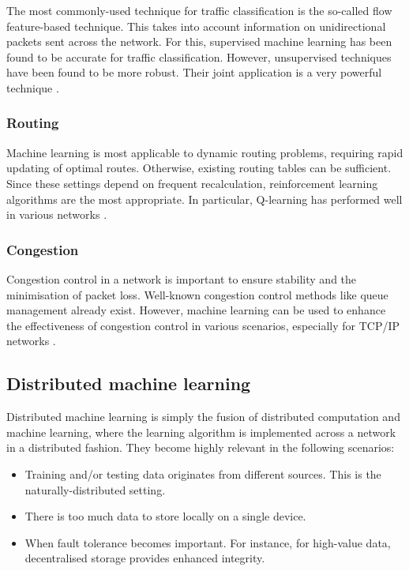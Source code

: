 \documentclass[twocolumn, aps, rmp, amsmath, amssymb, nofootinbib, superscriptaddress, longbibliography, floatfix, table-of-contents, eqsecnum]{revtex4}
\begin{document}
The most commonly-used technique for traffic classification is the so-called flow feature-based technique. This takes into account information on unidirectional packets sent across the network. For this, supervised machine learning has been found to be accurate for traffic classification. However, unsupervised techniques have been found to be more robust. Their joint application is a very powerful technique \cite{erman2007offline, zhang2015robust}.

\subsubsection{Routing}

Machine learning is most applicable to dynamic routing problems, requiring rapid updating of optimal routes. Otherwise, existing routing tables can be sufficient. Since these settings depend on frequent recalculation, reinforcement learning algorithms are the most appropriate. In particular, Q-learning has performed well in various networks \cite{wang2006adaptive, forster2007froms, arroyo2007q}.

\subsubsection{Congestion}

Congestion control in a network is important to ensure stability and the minimisation of packet loss. Well-known congestion control methods like queue management already exist. However, machine learning can be used to enhance the effectiveness of congestion control in various scenarios, especially for TCP/IP networks \cite{liu2002end, barman2004model, el2005improving}. 

\subsection{Distributed machine learning}

Distributed machine learning is simply the fusion of distributed computation and machine learning, where the learning algorithm is implemented across a network in a distributed fashion. They become highly relevant in the following scenarios:
\begin{itemize}
\item Training and/or testing data originates from different sources. This is the naturally-distributed setting.%
\item There is too much data to store locally on a single device.
\item When fault tolerance becomes important. For instance, for high-value data, decentralised storage provides enhanced integrity.
\end{itemize}
\end{document}
